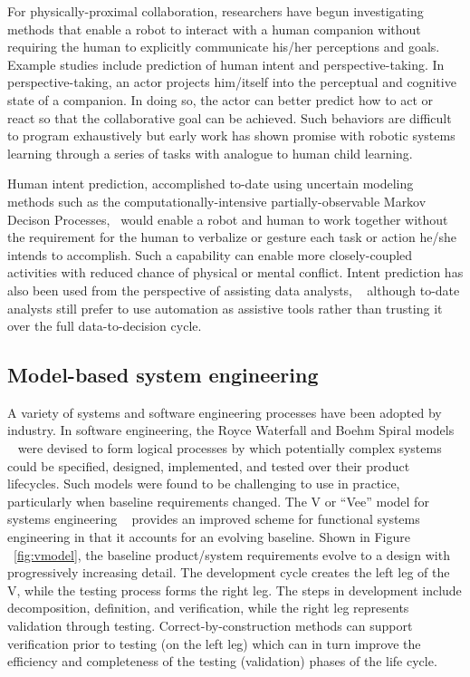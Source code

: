 For physically-proximal collaboration, researchers have begun investigating methods
that enable a robot to interact with a human companion without requiring the human to explicitly communicate
his/her perceptions and goals.  Example studies include prediction of human intent and perspective-taking.  
In perspective-taking, an actor projects him/itself into the perceptual and cognitive state of a companion.  
In doing so, the actor can better predict how to act or react so that the collaborative goal can be achieved.  
Such behaviors are difficult to program exhaustively but early work has 
shown promise with robotic systems learning through a series of tasks with analogue to human child 
learning.~\cite{trafton2005enabling}

Human intent prediction, accomplished to-date using uncertain modeling methods such as the 
computationally-intensive partially-observable Markov Decison Processes,~\cite{karami2010human} 
would enable a robot and human to work together without the requirement for the human to verbalize or gesture each task or action
he/she intends to accomplish. Such a capability can enable more closely-coupled activities with reduced chance of 
physical or mental conflict.  Intent prediction has also been used from the perspective of assisting data analysts,
~\cite{santos2003user} although to-date analysts still prefer to use automation as assistive tools rather than 
trusting it over the full data-to-decision cycle.


\subsection*{Model-based system engineering}


A variety of systems and software engineering processes have been adopted by industry.  
In software engineering, the Royce Waterfall and Boehm Spiral 
models ~\cite{estefan2007survey} were devised to form logical processes by which
potentially complex systems could be specified, designed, implemented, and tested over
their product lifecycles.  Such models were found to be challenging to use in practice, 
particularly when baseline requirements changed.  The V or ``Vee'' model for systems engineering 
~\cite{forsberg1999system} provides an improved scheme for functional systems engineering in 
that it accounts for an evolving baseline.  Shown in Figure ~\ref{fig:vmodel}, the baseline 
product/system requirements evolve to a design with progressively increasing detail.  The
development cycle creates the left leg of the V, while the testing process forms the right leg.
The steps in development include decomposition, definition, and verification, while 
the right leg represents validation through testing.  Correct-by-construction methods can support
verification prior to testing (on the left leg) which can in turn improve the efficiency and completeness
of the testing (validation) phases of the life cycle.

